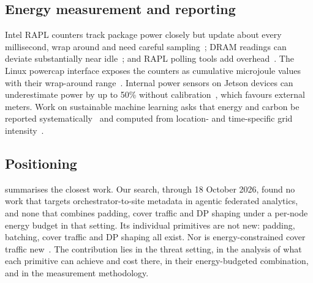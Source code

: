 \subsection{Energy measurement and reporting}
Intel RAPL counters track package power closely but update about every millisecond, wrap around and need careful sampling~\cite{khan2018rapl}; DRAM readings can deviate substantially near idle~\cite{desrochers2016validation}; and RAPL polling tools add overhead~\cite{diamond2026cost}. The Linux powercap interface exposes the counters as cumulative microjoule values with their wrap-around range~\cite{linux2026powercap}. Internal power sensors on Jetson devices can underestimate power by up to 50\% without calibration~\cite{shalavi2023accurate}, which favours external meters. Work on sustainable machine learning asks that energy and carbon be reported systematically~\cite{henderson2020towards,patterson2021carbon,lacoste2019quantifying} and computed from location- and time-specific grid intensity~\cite{dodge2022measuring}.

\subsection{Positioning}
 summarises the closest work. Our search, through 18 October 2026, found no work that targets orchestrator-to-site metadata in agentic federated analytics, and none that combines padding, cover traffic and DP shaping under a per-node energy budget in that setting. Its individual primitives are not new: padding, batching, cover traffic and DP shaping all exist. Nor is energy-constrained cover traffic new~\cite{kamat2005enhancing,shao2008towards,hugenroth2023powering}. The contribution lies in the threat setting, in the analysis of what each primitive can achieve and cost there, in their energy-budgeted combination, and in the measurement methodology.

